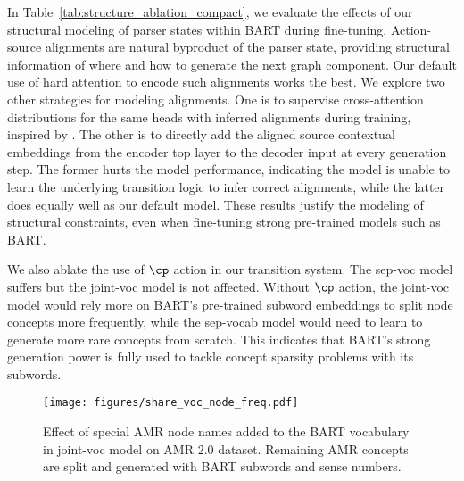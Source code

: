 In Table~\ref{tab:structure_ablation_compact}, we evaluate the effects of our structural modeling of parser states within BART during fine-tuning.
 Action-source alignments are natural byproduct of the parser state, providing structural information of where and how to generate the next graph component.
 Our default use of hard attention to encode such alignments works the best.
We explore two other strategies for modeling alignments. One is to supervise cross-attention distributions for the same heads with inferred alignments during training, inspired by \citet{strubell2018linguistically}. The other is to directly add the aligned source contextual embeddings from the encoder top layer to the decoder input at every generation step. The former hurts the model performance, indicating the model is unable to learn the underlying transition logic to infer correct alignments, while the latter does equally well as our default model. These results justify the modeling of structural constraints, even when fine-tuning strong pre-trained models such as BART.
 
We also ablate the use of $\cp$ action in our transition system. The sep-voc model suffers but the joint-voc model is not affected. Without $\cp$ action, the joint-voc model would rely more on BART's pre-trained subword embeddings to split node concepts more frequently, while the sep-vocab model would need to learn to generate more rare concepts from scratch. This indicates that BART's strong generation power is fully used to tackle concept sparsity problems with its subwords.


\begin{figure}
    \centering
    \texttt{[image: figures/share\_voc\_node\_freq.pdf]}
    \caption{Effect of special AMR node names added to the BART vocabulary in joint-voc model on AMR 2.0 dataset. Remaining AMR concepts are split and generated with BART subwords and sense numbers.}
    \label{fig:voc_min_node}
\end{figure}






